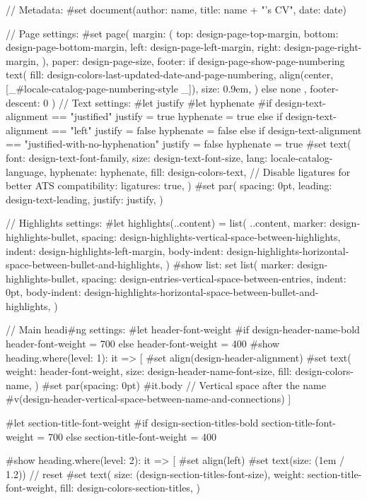 // Metadata:
#set document(author: name, title: name + "'s CV", date: date)

// Page settings:
#set page(
  margin: (
    top: design-page-top-margin,
    bottom: design-page-bottom-margin,
    left: design-page-left-margin,
    right: design-page-right-margin,
  ),
  paper: design-page-size,
  footer: if design-page-show-page-numbering {
    text(
      fill: design-colors-last-updated-date-and-page-numbering,
      align(center, [_#locale-catalog-page-numbering-style _]),
      size: 0.9em,
    )
  } else {
    none
  },
  footer-descent: 0%
)
// Text settings:
#let justify
#let hyphenate
#if design-text-alignment == "justified" {
  justify = true
  hyphenate = true
} else if design-text-alignment == "left" {
  justify = false
  hyphenate = false
} else if design-text-alignment == "justified-with-no-hyphenation" {
  justify = false
  hyphenate = true
}
#set text(
  font: design-text-font-family,
  size: design-text-font-size,
  lang: locale-catalog-language,
  hyphenate: hyphenate,
  fill: design-colors-text,
  // Disable ligatures for better ATS compatibility:
  ligatures: true,
)
#set par(
  spacing: 0pt,
  leading: design-text-leading,
  justify: justify,
)

// Highlights settings:
#let highlights(..content) = {
  list(
    ..content,
    marker: design-highlights-bullet,
    spacing: design-highlights-vertical-space-between-highlights,
    indent: design-highlights-left-margin,
    body-indent: design-highlights-horizontal-space-between-bullet-and-highlights,
  )
}
#show list: set list(
  marker: design-highlights-bullet,
  spacing: design-entries-vertical-space-between-entries,
  indent: 0pt,
  body-indent: design-highlights-horizontal-space-between-bullet-and-highlights,
)

// Main headi#ng settings:
#let header-font-weight
#if design-header-name-bold {
  header-font-weight = 700
} else {
  header-font-weight = 400
}
#show heading.where(level: 1): it => [
  #set align(design-header-alignment)
  #set text(
    weight: header-font-weight,
    size: design-header-name-font-size,
    fill: design-colors-name,
  )
  #set par(spacing: 0pt)
  #it.body
  // Vertical space after the name
  #v(design-header-vertical-space-between-name-and-connections)
]

#let section-title-font-weight
#if design-section-titles-bold {
  section-title-font-weight = 700
} else {
  section-title-font-weight = 400
}

#show heading.where(level: 2): it => [
  #set align(left)
  #set text(size: (1em / 1.2)) // reset
  #set text(
    size: (design-section-titles-font-size),
    weight: section-title-font-weight,
    fill: design-colors-section-titles,
  )

